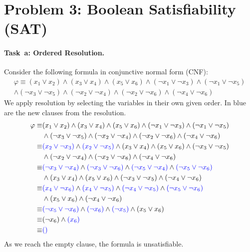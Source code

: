 \newcommand{\p}{\varphi}
\section*{Problem 3: Boolean Satisfiability (SAT)}

\newcommand{\MiniSat}{Mini\-Sat}  %
\newcommand{\SolverSAT}{\todo{\MiniSat}\xspace}  %
\newcommand{\TimeoutSAT}{\todo{60.0}}  %
\newcommand{\green}[1]{{\color{green}#1}}
\newcommand{\gray}[1]{{\color{gray}#1}}


\paragraph{Task~a: Ordered Resolution.}
Consider the following formula in conjunctive normal form (CNF):
\begin{multline*}
  \varphi \equiv (x_1 \lor x_2) \land
  (x_3 \lor x_4) \land
  (x_5 \lor x_6) \land
  (\neg x_1 \lor \neg x_3) \land
  (\neg x_1 \lor \neg x_5) \\ \land
  (\neg x_3 \lor \neg x_5) \land
  (\neg x_2 \lor \neg x_4) \land
  (\neg x_2 \lor \neg x_6) \land
  (\neg x_4 \lor \neg x_6)
\end{multline*}
We apply resolution by selecting the variables in their own given order. In blue are the new clauses from the resolution.
\begin{align*}
\varphi \equiv & (x_1 \lor x_2) \land
  	(x_3 \lor x_4) \land
  	(x_5 \lor x_6) \land
  	(\neg x_1 \lor \neg x_3) \land
  	(\neg x_1 \lor \neg x_5) \\ & \land
  	(\neg x_3 \lor \neg x_5) \land
  	(\neg x_2 \lor \neg x_4) \land
  	(\neg x_2 \lor \neg x_6) \land
  	(\neg x_4 \lor \neg x_6) \\
  \equiv & {\color{blue}(x_2 \lor \neg x_3)} \land
  	{\color{blue}(x_2 \lor \neg x_5)} \land
  	(x_3 \lor x_4) \land
	(x_5 \lor x_6) \land
	(\neg x_3 \lor \neg x_5) \\ & \land
	(\neg x_2 \lor \neg x_4) \land
  	(\neg x_2 \lor \neg x_6) \land
  	(\neg x_4 \lor \neg x_6) \\
  \equiv & {\color{blue}(\neg x_3 \lor \neg x_4)} \land
  	{\color{blue}(\neg x_3 \lor \neg x_6)} \land
	{\color{blue}(\neg x_5 \lor \neg x_4)} \land
	{\color{blue}(\neg x_5 \lor \neg x_6)} \\ & \land
	(x_3 \lor x_4) \land
	(x_5 \lor x_6) \land
	(\neg x_3 \lor \neg x_5) \land
  	(\neg x_4 \lor \neg x_6) \\
  \equiv & {\color{blue}(x_4 \lor \neg x_6)} \land
  	{\color{blue}(x_4 \lor \neg x_5)} \land
    {\color{blue}(\neg x_4 \lor \neg x_5)} \land
  	{\color{blue}(\neg x_5 \lor \neg x_6)} \\ & \land
  	(x_5 \lor x_6) \land
    (\neg x_4 \lor \neg x_6) \\
  \equiv & {\color{blue}(\neg x_5 \lor \neg x_6)} \land
    {\color{blue}(\neg x_6)} \land
    {\color{blue}(\neg x_5)} \land
    (x_5 \lor x_6) \\
    \equiv & (\neg x_6) \land {\color{blue}(x_6)} \\
    \equiv & {\color{blue}()}
\end{align*}
As we reach the empty clause, the formula is unsatisfiable.


